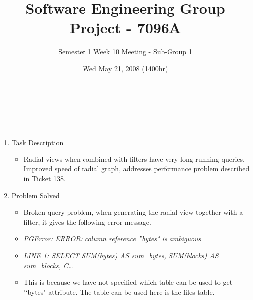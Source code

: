 \documentclass[10pt, a4]{article}
\begin{document}
\title{Software Engineering Group Project - 7096A}
\author{Semester 1 Week 10 Meeting - Sub-Group 1}
\date{Wed May 21, 2008 (1400hr)}

\maketitle 

\\
\\
\\
\begin{enumerate}
\item {Task Description}
  \begin{itemize}
  \item Radial views when combined with filters have very long running queries. Improved speed of radial graph, addresses performance problem described in Ticket 138.
  \end{itemize}
\item {Problem Solved}
  \begin{itemize}
  \item Broken query problem, when generating the radial view together with a filter, it gives the following error message.
  \item \emph{PGError: ERROR: column reference ''bytes" is ambiguous}
  \item \emph{LINE 1: SELECT SUM(bytes) AS sum\_bytes, SUM(blocks) AS sum\_blocks, C\ldots}
  \item This is because we have not specified which table can be used to get '‘bytes" attribute. The table can be used here is the files table.
  \end{itemize}
  

\end{enumerate}
\end{document}
